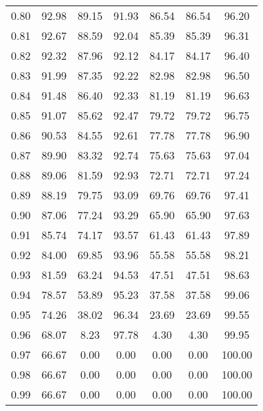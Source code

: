 \begin{tabular}{|c|c|c|c|c|c|c|}
      0.80 &     92.98 &     89.15 &      91.93 &   86.54 &      86.54 &         96.20 \\
      0.81 &     92.67 &     88.59 &      92.04 &   85.39 &      85.39 &         96.31 \\
      0.82 &     92.32 &     87.96 &      92.12 &   84.17 &      84.17 &         96.40 \\
      0.83 &     91.99 &     87.35 &      92.22 &   82.98 &      82.98 &         96.50 \\
      0.84 &     91.48 &     86.40 &      92.33 &   81.19 &      81.19 &         96.63 \\
      0.85 &     91.07 &     85.62 &      92.47 &   79.72 &      79.72 &         96.75 \\
      0.86 &     90.53 &     84.55 &      92.61 &   77.78 &      77.78 &         96.90 \\
      0.87 &     89.90 &     83.32 &      92.74 &   75.63 &      75.63 &         97.04 \\
      0.88 &     89.06 &     81.59 &      92.93 &   72.71 &      72.71 &         97.24 \\
      0.89 &     88.19 &     79.75 &      93.09 &   69.76 &      69.76 &         97.41 \\
      0.90 &     87.06 &     77.24 &      93.29 &   65.90 &      65.90 &         97.63 \\
      0.91 &     85.74 &     74.17 &      93.57 &   61.43 &      61.43 &         97.89 \\
      0.92 &     84.00 &     69.85 &      93.96 &   55.58 &      55.58 &         98.21 \\
      0.93 &     81.59 &     63.24 &      94.53 &   47.51 &      47.51 &         98.63 \\
      0.94 &     78.57 &     53.89 &      95.23 &   37.58 &      37.58 &         99.06 \\
      0.95 &     74.26 &     38.02 &      96.34 &   23.69 &      23.69 &         99.55 \\
      0.96 &     68.07 &      8.23 &      97.78 &    4.30 &       4.30 &         99.95 \\
      0.97 &     66.67 &      0.00 &       0.00 &    0.00 &       0.00 &        100.00 \\
      0.98 &     66.67 &      0.00 &       0.00 &    0.00 &       0.00 &        100.00 \\
      0.99 &     66.67 &      0.00 &       0.00 &    0.00 &       0.00 &        100.00 \\
\bottomrule
\end{tabular}
